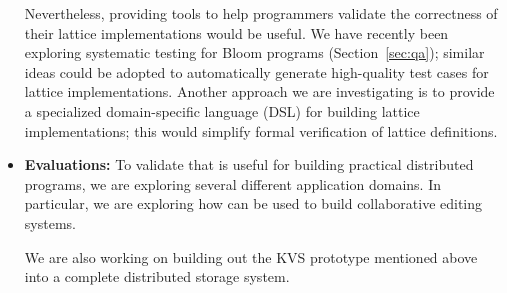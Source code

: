 \begin{itemize}
  Nevertheless, providing tools to help programmers validate the correctness
  of their lattice implementations would be useful. We have recently been
  exploring systematic testing for Bloom programs (Section~\ref{sec:qa});
  similar ideas could be adopted to automatically generate high-quality test
  cases for lattice implementations. Another approach we are investigating is to
  provide a specialized domain-specific language (DSL) for building lattice
  implementations; this would simplify formal verification of lattice
  definitions.

\item \textbf{Evaluations:} To validate that \blooml is useful for building
  practical distributed programs, we are exploring several different application
  domains. In particular, we are exploring how \blooml can be used to build
  collaborative editing systems.


  We are also working on building out the KVS prototype mentioned above into a
  complete distributed storage system.  
\end{itemize}


